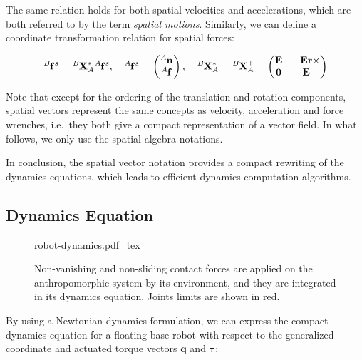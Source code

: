 The same relation holds for both spatial velocities and accelerations,
which are both referred to by the term \emph{spatial motions}.
Similarly, we can define a coordinate transformation relation for
spatial forces:

\begin{equation}
  \tensor*[^B]{\mathbf{f}}{^s}=
  \tensor*[^B]{\mathbf{X}}{^*_A}
  \tensor*[^A]{\mathbf{f}}{^s}
  ,\quad
  \tensor*[^A]{\mathbf{f}}{^s}=
  \left(\begin{matrix}
    \tensor*[^A]{\mathbf{n}}{}\\
    \tensor*[^A]{\mathbf{f}}{}
  \end{matrix}\right)
  ,\quad
  \tensor*[^B]{\mathbf{X}}{^*_A}=\tensor*[^B]{\mathbf{X}}{^\top_A}=
    \left(\begin{matrix}
    \mathbf{E} & -\mathbf{E}\mathbf{r}\times \\
    \mathbf{0} & \mathbf{E}
  \end{matrix}\right)
\end{equation}

Note that except for the ordering of the translation and rotation
components, spatial vectors represent the same concepts as velocity,
acceleration and force \linebreak wrenches, i.e.\ they both give a
compact representation of a vector field. In what follows, we only use
the spatial algebra notations.

In conclusion, the spatial vector notation provides a compact
rewriting of the dynamics equations, which leads to efficient dynamics
computation algorithms.

\subsection{Dynamics Equation}

\begin{figure}
  \centering
      {\def\svgwidth{0.4\linewidth}
        
                   {robot-dynamics.pdf_tex}
      }
      \caption{Non-vanishing and non-sliding contact forces are
        applied on the anthropomorphic system by its environment, and
        they are integrated in its dynamics equation. Joints limits
        are shown in red.}
      \label{fig:chap3-robot-dynamics}
\end{figure}

By using a Newtonian dynamics formulation, we can express the compact
dynamics equation for a floating-base robot with respect to the
generalized coordinate and actuated torque vectors $\mathbf{q}$ and
$\boldsymbol{\tau}$:

